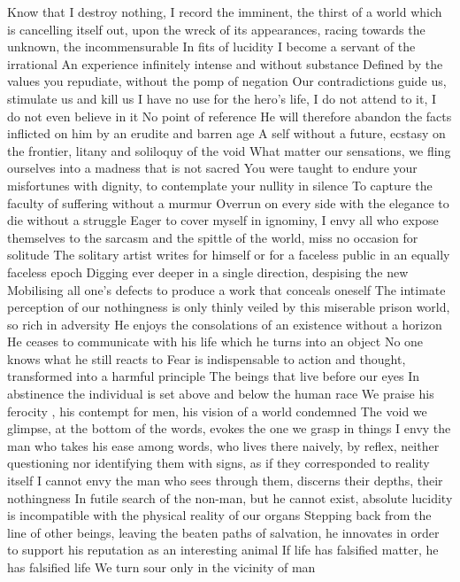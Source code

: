 \documentclass{article}
\begin{document}
Know that I destroy nothing, I record the imminent, the thirst of a world which is cancelling itself out, upon the wreck of its appearances, racing towards the unknown, the incommensurable
In fits of lucidity I become a servant of the irrational
An experience infinitely intense and without substance
Defined by the values you repudiate, without the pomp of negation
Our contradictions guide us, stimulate us and kill us
I have no use for the hero's life, I do not attend to it, I do not even believe in it
No point of reference
He will therefore abandon the facts inflicted on him by an erudite and barren age
A self without a future, ecstasy on the frontier, litany and soliloquy of the void
What matter our sensations, we fling ourselves into a madness that is not sacred
You were taught to endure your misfortunes with dignity, to contemplate your nullity in silence
To capture the faculty of suffering without a murmur
Overrun on every side with the elegance to die without a struggle
Eager to cover myself in ignominy, I envy all who expose themselves to the sarcasm and the spittle of the world, miss no occasion for solitude
The solitary artist writes for himself or for a faceless public in an equally faceless epoch
Digging ever deeper in a single direction, despising the new
Mobilising all one's defects to produce a work that conceals oneself
The intimate perception of our nothingness is only thinly veiled by this miserable prison world, so rich in adversity
He enjoys the consolations of an existence without a horizon
He ceases to communicate with his life which he turns into an object
No one knows what he still reacts to
Fear is indispensable  to action and thought, transformed into a harmful principle
The beings that live before our eyes
In abstinence the individual is set above and below the human race
We praise his ferocity , his contempt for men, his vision of a world condemned
The void we glimpse, at the bottom of the words, evokes the one we grasp in things
I envy the man who takes his ease among words, who lives there naively, by reflex, neither questioning nor identifying them with signs, as if they corresponded to reality itself
I cannot envy the man who sees through them, discerns their depths, their nothingness
In futile search of the non-man, but he cannot exist, absolute lucidity is incompatible with the physical reality of our organs
Stepping back from the line of other beings, leaving the beaten paths of salvation, he innovates in order to support his reputation as an interesting animal
If life has falsified matter, he has falsified life
We turn sour only in the vicinity of man
\end{document}
